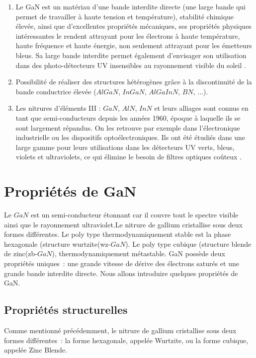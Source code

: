 \begin{enumerate}
	\item Le GaN est un matériau d'une bande interdite directe (une large bande qui permet de travailler à haute tension et température), stabilité chimique élevée, ainsi que d'excellentes propriétés mécaniques, ses propriétés physiques intéressantes le rendent attrayant pour les électrons à haute température, haute fréquence et haute énergie, non seulement attrayant pour les émetteurs bleus. Sa large bande interdite permet également d'envisager son utilisation dans des photo-détecteurs UV insensibles au rayonnement visible du soleil \cite{a3}.
	\item Possibilité de réaliser des structures hétérogènes grâce à la discontinuité de la bande conductrice élevée ($ AlGaN $, $ InGaN $, $ AlGaInN $, $ BN $, ...).
	\item Les nitrures d’éléments III : $ GaN $, $ AlN $, $ InN $ et leurs alliages sont connus en tant que semi-conducteurs depuis les années 1960, époque à laquelle ils se sont largement répandus. On les retrouve par exemple dans l'électronique industrielle ou les dispositifs optoélectroniques. Ils ont été étudiés dans une large gamme pour leurs utilisations dans les détecteurs UV verts, bleus, violets et ultraviolets, ce qui élimine le besoin de filtres optiques coûteux \cite{a4}. 
	
\end{enumerate}

\section{Propriétés de GaN}
Le $ GaN $ est un semi-conducteur étonnant car il couvre tout le spectre visible ainsi que le rayonnement ultraviolet.Le nitrure de gallium cristallise sous deux formes différentes. Le poly type thermodynamiquement stable est la phase hexagonale (structure wurtzite(wz-$GaN $). Le poly type cubique (structure blende de zinc(zb-$ GaN $), thermodynamiquement métastable. GaN possède deux propriétés uniques : une grande vitesse de dérive des électrons saturés et une grande bande interdite directe. Nous allons introduire quelques propriétés de GaN\cite{a5}. 

\subsection{Propriétés structurelles}

Comme mentionné précédemment, le nitrure de gallium cristallise sous deux formes différentes : la forme hexagonale, appelée Wurtzite, ou la forme cubique, appelée Zinc Blende\cite{a5}.

